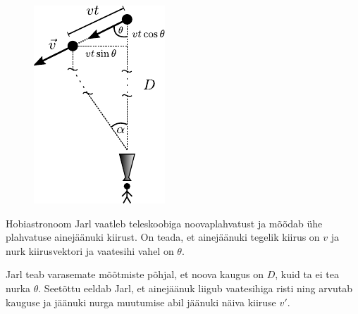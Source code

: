 
\begin{figure}
		\vspace{10pt}
		\includegraphics[width=1.1\linewidth]{2020-lahg-04-yl.pdf}
	\end{figure}
	Hobiastronoom Jarl vaatleb teleskoobiga noovaplahvatust ja mõõdab ühe plahvatuse ainejäänuki kiirust. On teada, et ainejäänuki tegelik kiirus on $v$ ja nurk kiirusvektori ja vaatesihi vahel on $\theta$.
	
	Jarl teab varasemate mõõtmiste põhjal, et noova kaugus on $D$, kuid ta ei tea nurka $\theta$. Seetõttu eeldab Jarl, et ainejäänuk liigub vaatesihiga risti ning arvutab kauguse ja jäänuki nurga muutumise abil jäänuki näiva kiiruse $v'$.
	
